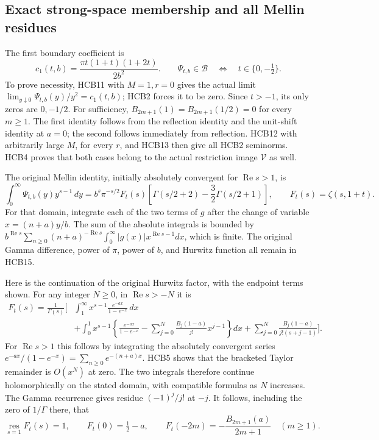 \subsection{Exact strong-space membership and all Mellin residues}

The first boundary coefficient is
\begin{equation}\tag{HCB14}
 c_1(t,b)=\frac{\pi t(1+t)(1+2t)}{2b^2}.
 \qquad
 \Psi_{t,b}\in\mathcal B
       \quad\Longleftrightarrow\quad t\in\{0,-\tfrac12\}.
\end{equation}
To prove necessity, HCB11 with $M=1,r=0$ gives the actual limit
$\lim_{y\downarrow0}\Psi_{t,b}(y)/y^2=c_1(t,b)$; HCB2 forces it
to be zero. Since $t>-1$, its only zeros are $0,-1/2$. For
sufficiency, $B_{2m+1}(1)=B_{2m+1}(1/2)=0$ for every $m\geq1$.
The first identity follows from the reflection identity and the
unit-shift identity at $a=0$; the second follows immediately from
reflection. HCB12 with arbitrarily large $M$, for every $r$, and
HCB13 then give all HCB2 seminorms. HCB4 proves that both cases
belong to the actual restriction image $\mathcal V$ as well.

The original Mellin identity, initially absolutely convergent for
$\operatorname{Re}s>1$, is
\begin{equation}\tag{HCB15}
 \int_0^\infty\Psi_{t,b}(y)y^{s-1}\,dy
 =b^s\pi^{-s/2}F_t(s)
       \left[\Gamma(s/2+2)-\frac32\Gamma(s/2+1)\right],
 \qquad F_t(s)=\zeta(s,1+t).
\end{equation}
For that domain, integrate each of the two terms of $g$ after
the change of variable $x=(n+a)y/b$. The sum of the absolute
integrals is bounded by
$b^{\operatorname{Re}s}\sum_{n\geq0}(n+a)^{-\operatorname{Re}s}
\int_0^\infty|g(x)|x^{\operatorname{Re}s-1}dx$, which is finite.
The original Gamma difference, power of $\pi$, power of $b$, and
Hurwitz function all remain in HCB15.

Here is the continuation of the original Hurwitz factor, with the
endpoint terms shown. For any integer $N\geq0$, in
$\operatorname{Re}s>-N$ it is
\begin{equation}\tag{HCB16}
\begin{split}
 F_t(s)=\frac1{\Gamma(s)}\bigg[&
 \int_1^\infty x^{s-1}\frac{e^{-a x}}{1-e^{-x}}\,dx\\
 &+\int_0^1x^{s-1}\left\{\frac{e^{-a x}}{1-e^{-x}}
             -\sum_{j=0}^N\frac{B_j(1-a)}{j!}x^{j-1}\right\}dx
 +\sum_{j=0}^N\frac{B_j(1-a)}{j!(s+j-1)}\bigg].
\end{split}
\end{equation}
For $\operatorname{Re}s>1$ this follows by integrating the absolutely
convergent series $e^{-a x}/(1-e^{-x})=\sum_{n\geq0}e^{-(n+a)x}$.
HCB5 shows that the bracketed Taylor remainder is $O(x^N)$ at
zero. The two integrals therefore continue holomorphically on the
stated domain, with compatible formulas as $N$ increases.
The Gamma recurrence gives residue $(-1)^j/j!$ at $-j$. It follows,
including the zero of $1/\Gamma$ there, that
\begin{equation}\tag{HCB17}
 \operatorname*{res}_{s=1}F_t(s)=1,\qquad
 F_t(0)=\tfrac12-a,\qquad
 F_t(-2m)=-\frac{B_{2m+1}(a)}{2m+1}\quad(m\geq1).
\end{equation}

